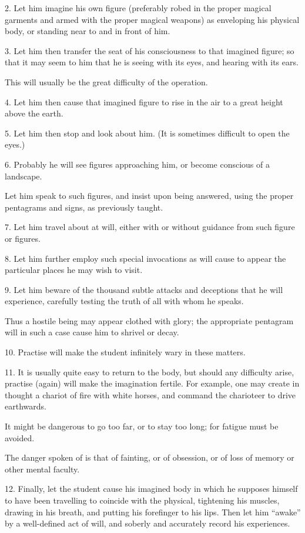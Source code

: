 2. Let him imagine his own figure (preferably robed in the proper magical garments and armed with the proper magical weapons) as enveloping his physical body, or standing near to and in front of him.

3. Let him then transfer the seat of his consciousness to that imagined figure; so that it may seem to him that he is seeing with its eyes, and hearing with its ears.

This will usually be the great difficulty of the operation.

4. Let him then cause that imagined figure to rise in the air to a great height above the earth.

5. Let him then stop and look about him. (It is sometimes difficult to open the eyes.)

6. Probably he will see figures approaching him, or become conscious of a landscape.

Let him speak to such figures, and insist upon being answered, using the proper pentagrams and signs, as previously taught.

7. Let him travel about at will, either with or without guidance from such figure or figures.

8. Let him further employ such special invocations as will cause to appear the particular places he may wish to visit.

9. Let him beware of the thousand subtle attacks and deceptions that he will experience, carefully testing the truth of all with whom he speaks.

Thus a hostile being may appear clothed with glory; the appropriate pentagram will in such a case cause him to shrivel or decay.

10. Practise will make the student infinitely wary in these matters.

11. It is usually quite easy to return to the body, but should any difficulty arise, practise (again) will make the imagination fertile. For example, one may create in thought a chariot of fire with white horses, and command the charioteer to drive earthwards.

It might be dangerous to go too far, or to stay too long; for fatigue must be avoided.

The danger spoken of is that of fainting, or of obsession, or of loss of memory or other mental faculty.

12. Finally, let the student cause his imagined body in which he supposes himself to have been travelling to coincide with the physical, tightening his muscles, drawing in his breath, and putting his forefinger to his lips. Then let him \enquote{awake} by a well-defined act of will, and soberly and accurately record his experiences.

